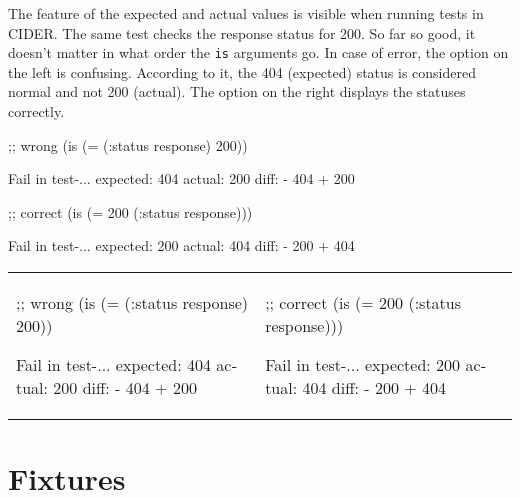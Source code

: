 
The feature of the expected and actual values is visible when running tests in CIDER. The same test checks the response status for 200. So far so good, it doesn't matter in what order the \verb|is| arguments go. In case of error, the option on the left is confusing. According to it, the 404 (expected) status is considered normal and not 200 (actual). The option on the right displays the statuses correctly.

\ifnarrow

\begin{english}
  \begin{clojure}
;; wrong
(is (= (:status response)
       200))

Fail in test-...
expected: 404
  actual: 200
    diff: - 404
          + 200
  \end{clojure}

\splitter

  \begin{clojure}
;; correct
(is (= 200
       (:status response)))

Fail in test-...
expected: 200
  actual: 404
    diff: - 200
          + 404
  \end{clojure}
\end{english}

\else

\begin{english}

\noindent
\begin{tabular}{ @{}p{5cm} @{}p{5cm} }

  \begin{clojure}
;; wrong
(is (= (:status response)
       200))

Fail in test-...
expected: 404
  actual: 200
    diff: - 404
          + 200
  \end{clojure}

&

  \begin{clojure}
;; correct
(is (= 200
       (:status response)))

Fail in test-...
expected: 200
  actual: 404
    diff: - 200
          + 404
  \end{clojure}

\end{tabular}

\end{english}

\fi

\section{Fixtures}

